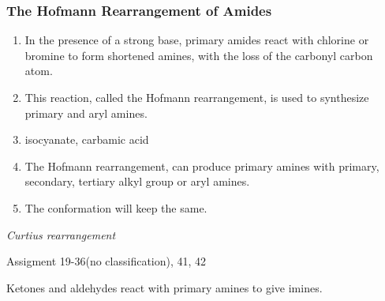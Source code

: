 \subsubsection{The Hofmann Rearrangement of Amides}

\begin{enumerate}
    \item In the presence of a strong base, primary amides react with chlorine or bromine to form shortened amines, with the loss of the carbonyl carbon atom.
    \item This reaction, called the Hofmann rearrangement, is used to synthesize primary and aryl amines.
    \item isocyanate, carbamic acid
    \item The Hofmann rearrangement, can produce primary amines with primary, secondary, tertiary alkyl group or aryl amines.
    \item The conformation will keep the same.
\end{enumerate}

\begin{example} %
    
\end{example}

\begin{example} %
    \textit{Curtius rearrangement}
\end{example}

Assigment 19-36(no classification), 41, 42

\begin{example} %
    Ketones and aldehydes react with primary amines to give imines.
\end{example}
